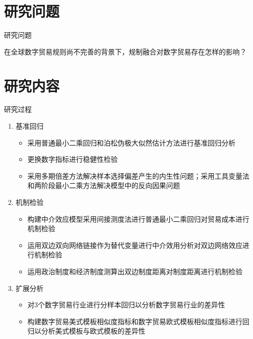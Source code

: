 \documentclass{beamer}
\begin{document}
\section{研究问题}
\begin{frame}{研究问题}
    \centering
    \large
    \begin{itemize}
        \begin{tcolorbox}[colback=lightyellow,colframe=deepblue,coltext=black]
            \item 在全球数字贸易规则尚不完善的背景下，规制融合对数字贸易存在怎样的影响？
        \end{tcolorbox}
    \end{itemize}
\end{frame}


\section{研究内容}
\begin{frame}{研究过程}
    \begin{enumerate}
        \item 基准回归
        \begin{itemize}
            \item {\footnotesize 采用普通最小二乘回归和泊松伪极大似然估计方法进行基准回归分析}
            \item {\footnotesize 更换数字指标进行稳健性检验}
            \item {\footnotesize 采用多期倍差方法解决样本选择偏差产生的内生性问题；采用工具变量法和两阶段最小二乘方法解决模型中的反向因果问题}
        \end{itemize}
        \item 机制检验
        \begin{itemize}
            \item {\footnotesize 构建中介效应模型采用间接测度法进行普通最小二乘回归对贸易成本进行机制检验}
            \item {\footnotesize 运用双边双向网络链接作为替代变量进行中介效用分析对双边网络效应进行机制检验}
            \item {\footnotesize 运用政治制度和经济制度测算出双边制度距离对制度距离进行机制检验}
        \end{itemize}
        \item 扩展分析
        \begin{itemize}
            \item {\footnotesize 对3个数字贸易行业进行分样本回归以分析数字贸易行业的差异性}
            \item {\footnotesize 构建数字贸易美式模板相似度指标和数字贸易欧式模板相似度指标进行回归以分析美式模板与欧式模板的差异性}
        \end{itemize}
    \end{enumerate}
\end{frame}
\end{document}
